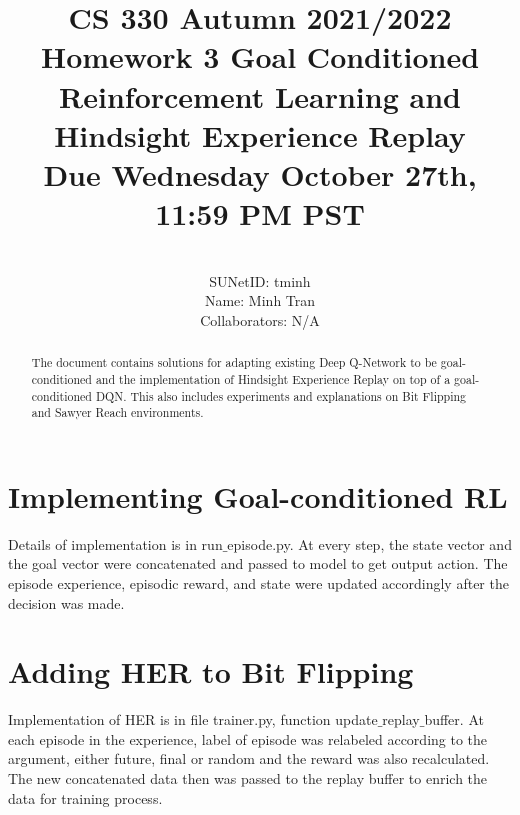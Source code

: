 \documentclass[]{article}
\title{\textbf{CS 330 Autumn 2021/2022 Homework 3}
	{Goal Conditioned Reinforcement Learning and
		Hindsight Experience Replay \\
		Due Wednesday October 27th, 11:59 PM PST}}
\author{
			\\SUNetID: tminh 
			\\Name: Minh Tran 
			\\Collaborators: N/A 
		}
\begin{document}
	
	\maketitle
	
	\begin{abstract}
		
		The document contains solutions for adapting existing Deep Q-Network to be goal-conditioned and the implementation of Hindsight Experience Replay on top of a goal-conditioned DQN. This also includes experiments and explanations on Bit Flipping and Sawyer Reach environments. 
		
	\end{abstract}
	
	\section{Implementing Goal-conditioned RL}
	Details of implementation is in run$\_$episode.py. At every step, the state vector and the goal vector were concatenated and passed to model to get output action. The episode experience, episodic reward, and state were updated accordingly after the decision was made.
	
	\section{Adding HER to Bit Flipping}
	Implementation of HER is in file trainer.py, function update$\_$replay$\_$buffer. At each episode in the experience, label of episode was relabeled according to the argument, either future, final or random and the reward was also recalculated. The new concatenated data then was passed to the replay buffer to enrich the data for training process.  
	
\end{document}
